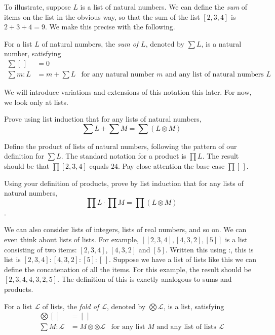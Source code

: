 To illustrate, suppose $L$ is a list of natural numbers. We can define the \emph{sum} of items on the list
in the obvious way, so that the sum of the list $[2,3,4]$ is $2+3+4 = 9$. We make this precise with the following.

\begin{defn}
	For a list $L$ of natural numbers, the \emph{sum of $L$}, denoted by $\sum L$, is a natural number, satisfying
	\begin{align*}
	\sum[\,] &= 0\\
	\sum m:L &= m + \sum L &\text{for any natural number $m$ and any list of natural numbers $L$}
	\end{align*}
\end{defn}

We will introduce variations and extensions of this notation this later. For now, we look only at lists. 

\begin{exer}
	\begin{exercise} 
\item Prove using list induction that for any lists of natural numbers,
\[\sum L + \sum M = \sum (L\otimes M)\]
\item Define the product of lists of natural numbers, following the pattern of our definition for $\sum L$. The standard notation
for a product is $\prod L$. The result should be that $\prod[2,3,4]$ equals $24$. Pay close attention the base case $\prod[\,]$.
\item Using your definition of products, prove by list induction that for any lists of natural numbers,
\[\prod L\cdot \prod M = \prod(L\otimes M)\]. 
\end{exercise}
\end{exer}

We can also consider lists of integers, lists of real numbers, and so on. We can even think about lists of lists.
For example, $[[2,3,4],[4,3,2],[5]]$ is a list consisting of two items: $[2,3,4]$, $[4,3,2]$ and $[5]$. Written this using
:, this is list is $[2,3,4]:[4,3,2]:[5]:[\,]$. Suppose we have a list of lists like this we can define the
concatenation of all the items. For this example, the result should be $[2,3,4,4,3,2,5]$. The definition of this
is exactly analogous to sums and products.

\begin{defn}
	For a list $\mathcal L$ of lists, the \emph{fold of $\mathcal L$}, denoted by $\bigotimes \mathcal L$, is a list, satisfying
	\begin{align*}
	\bigotimes[\,] &= [\,]\\
	\sum M:\mathcal L &= M \otimes \otimes \mathcal L &\text{for any list $M$ and any list of lists $\mathcal L$}
	\end{align*}
\end{defn}

